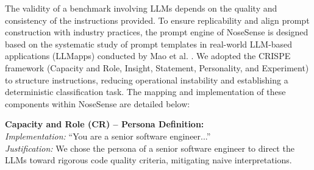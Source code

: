 \documentclass[sigconf]{acmart}
\begin{document}
The validity of a benchmark involving LLMs depends on the quality and consistency of the instructions provided. To ensure replicability and align prompt construction with industry practices, the prompt engine of NoseSense is designed based on the systematic study of prompt templates in real-world LLM-based applications (LLMapps) conducted by Mao et al. \cite{mao2025prompts}. We adopted the CRISPE framework (Capacity and Role, Insight, Statement, Personality, and Experiment) \cite{wang2023unleashing} to structure instructions, reducing operational instability and establishing a deterministic classification task. The mapping and implementation of these components within NoseSense are detailed below:

\textbf{Capacity and Role (CR) -- Persona Definition:} \\
    \textit{Implementation:} ``You are a senior software engineer...'' \\
    \textit{Justification:} We chose the persona of a senior software engineer to direct the LLMs toward rigorous code quality criteria, mitigating naive interpretations.
    
\end{document}
